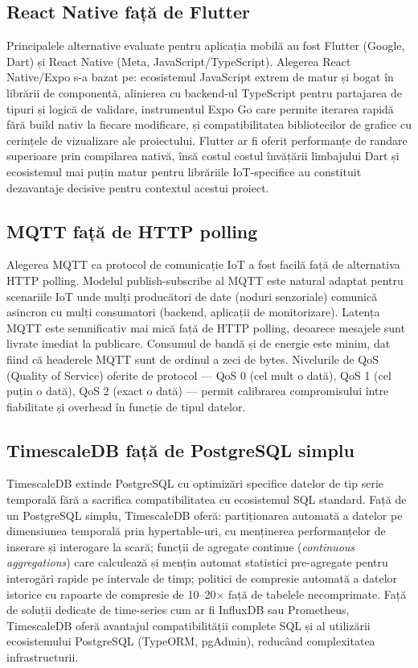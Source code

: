 \documentclass[12pt, twoside, a4paper]{report}
\begin{document}
\subsection{React Native față de Flutter}

Principalele alternative evaluate pentru aplicația mobilă au fost Flutter (Google, Dart)
și React Native (Meta, JavaScript/TypeScript). Alegerea React Native/Expo s-a bazat pe:
ecosistemul JavaScript extrem de matur și bogat în librării de componentă, alinierea cu
backend-ul TypeScript pentru partajarea de tipuri și logică de validare, instrumentul
Expo Go care permite iterarea rapidă fără build nativ la fiecare modificare, și
compatibilitatea bibliotecilor de grafice cu cerințele de vizualizare ale proiectului.
Flutter ar fi oferit performanțe de randare superioare prin compilarea nativă, însă costul
costul învățării limbajului Dart și ecosistemul mai puțin matur pentru librăriile IoT-specifice
au constituit dezavantaje decisive pentru contextul acestui proiect.

\subsection{MQTT față de HTTP polling}

Alegerea MQTT ca protocol de comunicație IoT a fost facilă față de alternativa HTTP polling.
Modelul publish-subscribe al MQTT este natural adaptat pentru scenariile IoT unde mulți
producători de date (noduri senzoriale) comunică asincron cu mulți consumatori (backend,
aplicații de monitorizare). Latența MQTT este semnificativ mai mică față de HTTP polling,
deoarece mesajele sunt livrate imediat la publicare. Consumul de bandă și de energie este
minim, dat fiind că headerele MQTT sunt de ordinul a zeci de bytes. Nivelurile de QoS
(Quality of Service) oferite de protocol --- QoS 0 (cel mult o dată), QoS 1 (cel puțin o dată),
QoS 2 (exact o dată) --- permit calibrarea compromisului între fiabilitate și overhead
în funcție de tipul datelor.

\subsection{TimescaleDB față de PostgreSQL simplu}

TimescaleDB extinde PostgreSQL cu optimizări specifice datelor de tip serie temporală
fără a sacrifica compatibilitatea cu ecosistemul SQL standard. Față de un PostgreSQL simplu,
TimescaleDB oferă: partiționarea automată a datelor pe dimensiunea temporală prin
hypertable-uri, cu menținerea performanțelor de inserare și interogare la scară; funcții
de agregate continue (\textit{continuous aggregations}) care calculează și mențin automat
statistici pre-agregate pentru interogări rapide pe intervale de timp; politici de compresie
automată a datelor istorice cu rapoarte de compresie de 10--20$\times$ față de tabelele
necomprimate. Față de soluții dedicate de time-series cum ar fi InfluxDB sau Prometheus,
TimescaleDB oferă avantajul compatibilității complete SQL și al utilizării ecosistemului
PostgreSQL (TypeORM, pgAdmin), reducând complexitatea infrastructurii.
\end{document}
